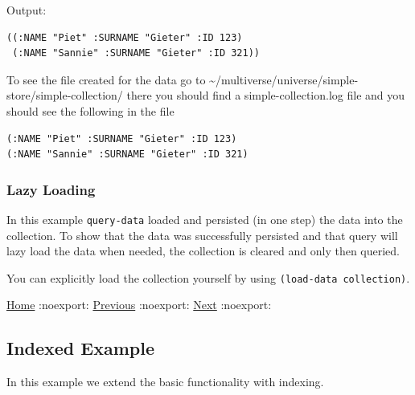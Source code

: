 \documentclass[11pt]{article}
\begin{document}
Output:

\begin{verbatim}
((:NAME "Piet" :SURNAME "Gieter" :ID 123)
 (:NAME "Sannie" :SURNAME "Gieter" :ID 321))
\end{verbatim}

To see the file created for the data go to
\textasciitilde{}/multiverse/universe/simple-store/simple-collection/ there you should
find a simple-collection.log file and you should see the following in
the file

\begin{verbatim}
(:NAME "Piet" :SURNAME "Gieter" :ID 123)
(:NAME "Sannie" :SURNAME "Gieter" :ID 321)
\end{verbatim}

\subsubsection{Lazy Loading}
\label{sec:orgbc8816b}

In this example \texttt{query-data} loaded and persisted (in one step) the
data into the collection. To show that the data was successfully
persisted and that query will lazy load the data when needed, the
collection is cleared and only then queried. 

You can explicitly load the collection yourself by using \texttt{(load-data collection)}.

\href{home.org}{Home} :noexport: \href{basic-example.org}{Previous} :noexport: \href{indexed-example.org}{Next} :noexport:
\subsection{Indexed Example}
\label{sec:org009f10a}

In this example we extend the basic functionality with indexing.
\end{document}
